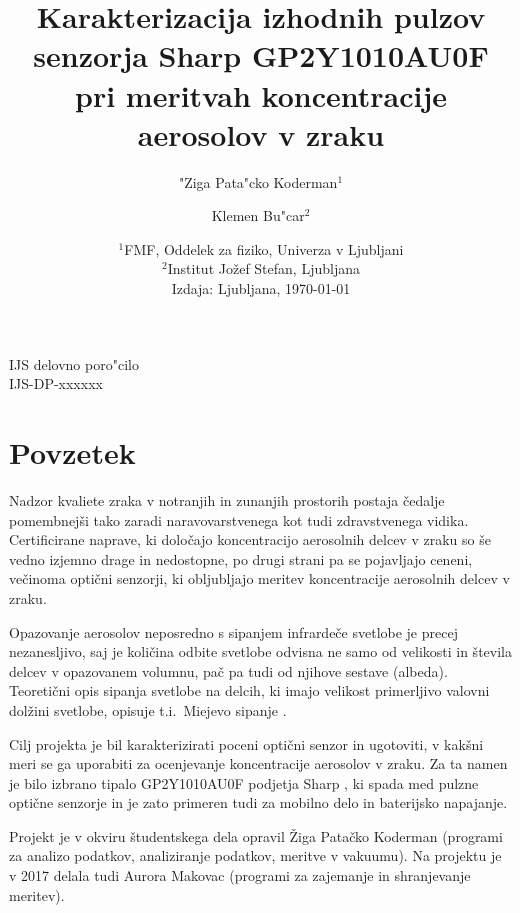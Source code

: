 \documentclass[11pt,a4paper]{article}
\begin{document}
\title{Karakterizacija izhodnih pulzov senzorja Sharp GP2Y1010AU0F pri meritvah koncentracije aerosolov v zraku}
\author{"Ziga Pata"cko Koderman$^1$ \and Klemen Bu"car$^2$}
\date{%
  $^1$FMF, Oddelek za fiziko, Univerza v Ljubljani\\
  $^2$Institut Jožef Stefan, Ljubljana\\[3ex]
  Izdaja: Ljubljana, \today
}

\maketitle
\thispagestyle{empty}

\begin{center}
IJS delovno poro"cilo\\ IJS-DP-xxxxxx
\end{center}

\tableofcontents
\pagebreak

\section{Povzetek}

Nadzor kvaliete zraka v notranjih in zunanjih prostorih postaja čedalje pomembnejši tako zaradi naravovarstvenega kot tudi zdravstvenega vidika. Certificirane naprave, ki določajo koncentracijo aerosolnih delcev v zraku so še vedno izjemno drage in nedostopne, po drugi strani pa se pojavljajo ceneni, večinoma optični senzorji, ki obljubljajo meritev koncentracije aerosolnih delcev v zraku.

Opazovanje aerosolov neposredno s sipanjem infrardeče svetlobe je precej nezanesljivo, saj je količina odbite svetlobe odvisna ne samo od velikosti in števila delcev v opazovanem volumnu, pač pa tudi od njihove sestave (albeda). Teoretični opis sipanja svetlobe na delcih, ki imajo velikost primerljivo valovni dolžini svetlobe, opisuje t.i.~Miejevo sipanje \cite{miejevo}.

Cilj projekta je bil karakterizirati poceni optični senzor in ugotoviti, v kakšni meri se ga uporabiti za ocenjevanje koncentracije aerosolov v zraku. Za ta namen je bilo izbrano tipalo GP2Y1010AU0F podjetja Sharp \cite{sharp-gp2y1010au0f},
ki spada med pulzne optične senzorje in je zato primeren tudi za mobilno delo in baterijsko napajanje. 

Projekt je v okviru študentskega dela opravil Žiga Patačko Koderman (programi za analizo podatkov, analiziranje podatkov, meritve v vakuumu). Na projektu je v 2017 delala tudi Aurora Makovac (programi za zajemanje in shranjevanje meritev).
\end{document}
